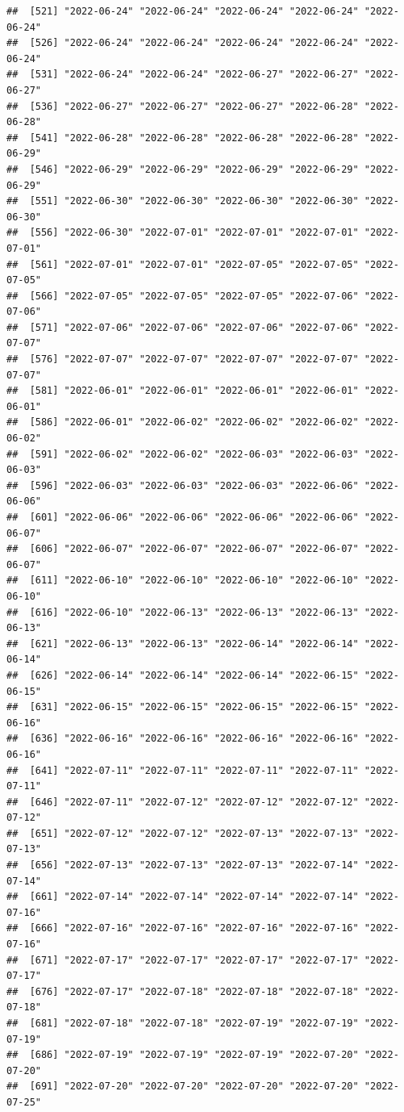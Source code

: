 \documentclass[
]{article}
\begin{document}
\begin{verbatim}
##  [521] "2022-06-24" "2022-06-24" "2022-06-24" "2022-06-24" "2022-06-24"
##  [526] "2022-06-24" "2022-06-24" "2022-06-24" "2022-06-24" "2022-06-24"
##  [531] "2022-06-24" "2022-06-24" "2022-06-27" "2022-06-27" "2022-06-27"
##  [536] "2022-06-27" "2022-06-27" "2022-06-27" "2022-06-28" "2022-06-28"
##  [541] "2022-06-28" "2022-06-28" "2022-06-28" "2022-06-28" "2022-06-29"
##  [546] "2022-06-29" "2022-06-29" "2022-06-29" "2022-06-29" "2022-06-29"
##  [551] "2022-06-30" "2022-06-30" "2022-06-30" "2022-06-30" "2022-06-30"
##  [556] "2022-06-30" "2022-07-01" "2022-07-01" "2022-07-01" "2022-07-01"
##  [561] "2022-07-01" "2022-07-01" "2022-07-05" "2022-07-05" "2022-07-05"
##  [566] "2022-07-05" "2022-07-05" "2022-07-05" "2022-07-06" "2022-07-06"
##  [571] "2022-07-06" "2022-07-06" "2022-07-06" "2022-07-06" "2022-07-07"
##  [576] "2022-07-07" "2022-07-07" "2022-07-07" "2022-07-07" "2022-07-07"
##  [581] "2022-06-01" "2022-06-01" "2022-06-01" "2022-06-01" "2022-06-01"
##  [586] "2022-06-01" "2022-06-02" "2022-06-02" "2022-06-02" "2022-06-02"
##  [591] "2022-06-02" "2022-06-02" "2022-06-03" "2022-06-03" "2022-06-03"
##  [596] "2022-06-03" "2022-06-03" "2022-06-03" "2022-06-06" "2022-06-06"
##  [601] "2022-06-06" "2022-06-06" "2022-06-06" "2022-06-06" "2022-06-07"
##  [606] "2022-06-07" "2022-06-07" "2022-06-07" "2022-06-07" "2022-06-07"
##  [611] "2022-06-10" "2022-06-10" "2022-06-10" "2022-06-10" "2022-06-10"
##  [616] "2022-06-10" "2022-06-13" "2022-06-13" "2022-06-13" "2022-06-13"
##  [621] "2022-06-13" "2022-06-13" "2022-06-14" "2022-06-14" "2022-06-14"
##  [626] "2022-06-14" "2022-06-14" "2022-06-14" "2022-06-15" "2022-06-15"
##  [631] "2022-06-15" "2022-06-15" "2022-06-15" "2022-06-15" "2022-06-16"
##  [636] "2022-06-16" "2022-06-16" "2022-06-16" "2022-06-16" "2022-06-16"
##  [641] "2022-07-11" "2022-07-11" "2022-07-11" "2022-07-11" "2022-07-11"
##  [646] "2022-07-11" "2022-07-12" "2022-07-12" "2022-07-12" "2022-07-12"
##  [651] "2022-07-12" "2022-07-12" "2022-07-13" "2022-07-13" "2022-07-13"
##  [656] "2022-07-13" "2022-07-13" "2022-07-13" "2022-07-14" "2022-07-14"
##  [661] "2022-07-14" "2022-07-14" "2022-07-14" "2022-07-14" "2022-07-16"
##  [666] "2022-07-16" "2022-07-16" "2022-07-16" "2022-07-16" "2022-07-16"
##  [671] "2022-07-17" "2022-07-17" "2022-07-17" "2022-07-17" "2022-07-17"
##  [676] "2022-07-17" "2022-07-18" "2022-07-18" "2022-07-18" "2022-07-18"
##  [681] "2022-07-18" "2022-07-18" "2022-07-19" "2022-07-19" "2022-07-19"
##  [686] "2022-07-19" "2022-07-19" "2022-07-19" "2022-07-20" "2022-07-20"
##  [691] "2022-07-20" "2022-07-20" "2022-07-20" "2022-07-20" "2022-07-25"

\end{verbatim}
\end{document}
